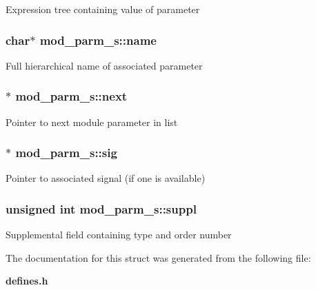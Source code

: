 Expression tree containing value of parameter 
\subsubsection{\setlength{\rightskip}{0pt plus 5cm}char$\ast$ {\bf mod\_\-parm\_\-s::name}}\label{structmod__parm__s_o0}


Full hierarchical name of associated parameter 
\subsubsection{$\ast$ {\bf mod\_\-parm\_\-s::next}}\label{structmod__parm__s_o6}


Pointer to next module parameter in list 
\subsubsection{$\ast$ {\bf mod\_\-parm\_\-s::sig}}\label{structmod__parm__s_o5}


Pointer to associated signal (if one is available) 
\subsubsection{\setlength{\rightskip}{0pt plus 5cm}unsigned int {\bf mod\_\-parm\_\-s::suppl}}\label{structmod__parm__s_o2}


Supplemental field containing type and order number 

The documentation for this struct was generated from the following file:\begin{CompactItemize}
\item 
{\bf defines.h}\end{CompactItemize}
